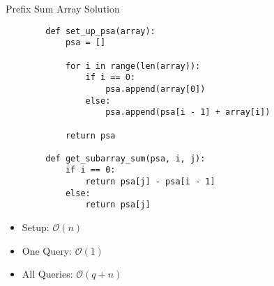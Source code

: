 \documentclass{beamer}
\begin{document}
\begin{frame}[fragile]{Prefix Sum Array Solution}
    \begin{lstlisting}
        def set_up_psa(array):
            psa = []
            
            for i in range(len(array)):
                if i == 0:
                    psa.append(array[0])
                else:
                    psa.append(psa[i - 1] + array[i])
        
            return psa
        
        def get_subarray_sum(psa, i, j):
            if i == 0:
                return psa[j] - psa[i - 1]
            else:
                return psa[j]
    \end{lstlisting}
    
    \begin{itemize}
        \item Setup: $\mathcal{O}(n)$
        \item One Query: $\mathcal{O}(1)$
        \item All Queries: $\mathcal{O}(q + n)$
    \end{itemize}
\end{frame}
\end{document}
